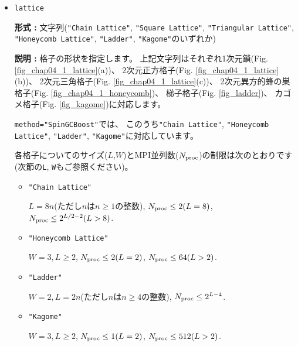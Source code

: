 \begin{itemize}
  {\bf 形式 :} 文字列(\verb|"Lanczos"|, \verb|"TPQ"|, \verb|"Full Diag"|,
  \verb|"CG"|のいずれか)

{\bf 説明 :} 実行する計算の種類を指定します。
上記の文字列はそれぞれランチョス法による少数固有状態の計算, 
熱力学的純粋状態を用いた有限温度計算, 
直接法による全固有状態計算,
LOBCG法\cite{doi:10.1137/S1064827500366124,transactionJSCES2006}による少数固有状態の計算
に対応します。

\item \verb|lattice|

{\bf 形式 :} 文字列(\verb|"Chain Lattice"|, \verb|"Square Lattice"|, 
\verb|"Triangular Lattice"|, \verb|"Honeycomb Lattice"|, \verb|"Ladder"|, \verb|"Kagome"|のいずれか)

{\bf 説明 :} 格子の形状を指定します。
上記文字列はそれぞれ1次元鎖(Fig. \ref{fig_chap04_1_lattice}(a))、
2次元正方格子(Fig. \ref{fig_chap04_1_lattice}(b))、
2次元三角格子(Fig. \ref{fig_chap04_1_lattice}(c))、
2次元異方的蜂の巣格子(Fig. \ref{fig_chap04_1_honeycomb})、
梯子格子(Fig. \ref{fig_ladder})、
カゴメ格子(Fig. \ref{fig_kagome})に対応します。

\verb|method="SpinGCBoost"|では、
このうち\verb|"Chain Lattice"|, \verb|"Honeycomb Lattice"|, 
\verb|"Ladder"|, \verb|"Kagome"|に対応しています。

各格子についてのサイズ($L$,$W$)とMPI並列数($N_{\rm proc}$)の制限は次のとおりです
(次節の\verb|L|, \verb|W|もご参照ください)。

\begin{itemize}

  \item \verb|"Chain Lattice"|

    $L = 8n$(ただし$n$は$n\geq1$の整数),
    $N_{\rm proc} \leq 2(L=8)$, $N_{\rm proc} \leq 2^{L/2-2}(L>8)$.
    
  \item \verb|"Honeycomb Lattice"|

    $W=3, L \geq 2$, $N_{\rm proc} \leq 2(L=2)$, $N_{\rm proc} \leq 64(L>2)$.

  \item \verb|"Ladder"|

    $W=2, L = 2n$(ただし$n$は$n\geq4$の整数),
    $N_{\rm proc} \leq 2^{L-4}$.

  \item \verb|"Kagome"|

    $W=3, L \geq 2$, $N_{\rm proc} \leq 1(L=2)$, $N_{\rm proc} \leq 512(L>2)$.

\end{itemize}


\end{itemize}
